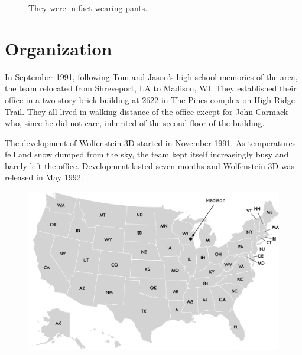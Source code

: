 \documentclass[book.tex]{subfiles}
\begin{document}
\begin{figure}[H]
\centering
  
    
\caption{They were in fact wearing pants.}
\label{fig:id_team_1993}
\end{figure}

\section{Organization}

In September 1991, following Tom and Jason's high-school memories of the area, the team relocated from Shreveport, LA to Madison, WI. They established their office in a two story brick building at 2622 in The Pines complex on High Ridge Trail. They all lived in walking distance of the office except for John Carmack who, since he did not care, inherited of the second floor of the building.\\
\par
The development of Wolfenstein 3D started in November 1991. As temperatures fell and snow dumped from the sky, the team kept itself increasingly busy and barely left the office. Development lasted seven months and Wolfenstein 3D was released in May 1992.\\




\begin{figure}[H]
\centering
 \includegraphics[width=\textwidth]{imgs/drawings/map/usa-id-software.eps}
 \end{figure}


\par
\end{document}

